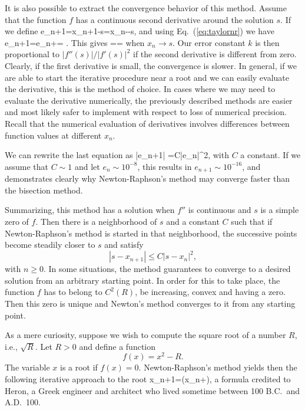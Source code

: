 It is also possible to extract the convergence behavior 
of this method. Assume that the function $f$ has a continuous
second derivative around the solution $s$. 
If we define
\be 
    e_{n+1}=x_{n+1}-s=x_n--s,
\ee
and
using Eq.\ (\ref{eq:taylornr}) we have
\be
   e_{n+1}=e_{n}+=
           .
\ee
This gives
\be
   ==
\ee
when $x_n\rightarrow s$. Our error constant $k$ is then
proportional  to $|f''(s)|/|f'(s)|^2$ if the second derivative
is different from zero.
Clearly, if the first derivative is small, the convergence
is slower. In general, if we are able to start
the iterative procedure near a root and we can easily
evaluate the derivative, this is the method of choice.
In cases where we may need to evaluate the derivative
numerically, the previously described methods are easier
and most likely safer to implement with respect to
loss of numerical precision. Recall that the numerical
evaluation of derivatives involves differences between function
values at different $x_n$. 

We can rewrite the last equation as
\be
   |e_{n+1}| =C|e_n|^2,
\ee
with $C$ a constant.
If we assume that $C\sim 1$ and let $e_{n}\sim 10^{-8}$,
this results in $e_{n+1}\sim 10^{-16}$, and demonstrates clearly why
Newton-Raphson's method may converge faster than the bisection method. 

Summarizing, this method has a solution when $f''$ is continuous and $s$ is
a simple zero of $f$. Then there is a neighborhood of $s$ and a constant 
$C$ such that if Newton-Raphson's method is started in that neighborhood,
the successive points become steadily closer to $s$ and satisfy
\[
   |s-x_{n+1}| \le C|s-x_n|^2,
\]
with $n \ge 0$. 
In some situations, the method guarantees to converge to a desired solution
from an arbitrary starting point. In order for this to take place, the 
function $f$ has to belong to $C^2(R)$, be increasing, convex 
and having a zero. Then this zero is unique and Newton's method converges
to it from any starting point.    

As a mere curiosity, suppose we wish to compute the square root of 
a number $R$, i.e., $\sqrt{R}$. Let $R > 0$ and define a function
\[
  f(x)=x^2-R.
\]
The variable $x$ is a root if $f(x)=0$. Newton-Raphson's method
yields then the following iterative approach to the root
\be
   x_{n+1}=\left(x_n+\right),
\ee
a formula credited to Heron, a Greek engineer and architect who lived 
sometime between 100 B.C.~and A.D.~100.

